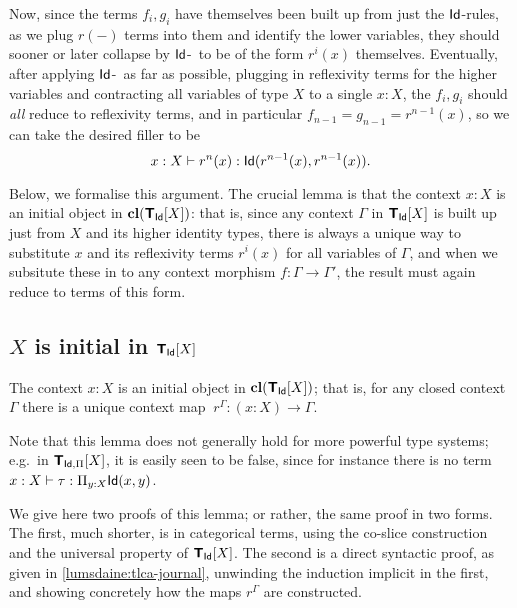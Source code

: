 \begin{center}\end{center}

Now, since the terms $f_i,g_i$ have themselves been built up from just the $\mathsf{Id}$-rules, as we plug $r(-)$ terms into them and identify the lower variables, they should sooner or later collapse by $\mathsf{Id}$-\comp\ to be of the form $r^i(x)$ themselves.  Eventually, after applying $\mathsf{Id}$-\elim\ as far as possible, plugging in reflexivity terms for the higher variables and contracting all variables of type $X$ to a single $x:X$, the $f_i, g_i$ should \emph{all} reduce to reflexivity terms, and in particular $f_{n-1} = g_{n-1} = r^{n-1}(x)$, so we can take the desired filler to be
$$x:X \vdash r^n(x) : \mathsf{Id}(r^{n-1}(x),r^{n-1}(x)).$$

Below, we formalise this argument.  The crucial lemma is that the context $x:X$ is an initial object in $\mathbf{cl}(\textbf{\textsf{T}}_{\mathsf{Id}}[X])$: that is, since any context $\Gamma$ in $\textbf{\textsf{T}}_{\mathsf{Id}}[X]$ is built up just from $X$ and its higher identity types, there is always a unique way to substitute $x$ and its reflexivity terms $r^i(x)$ for all variables of $\Gamma$, and when we subsitute these in to any context morphism $f \colon \Gamma \to \Gamma'$, the result must again reduce to terms of this form.

\subsection{\texorpdfstring{$X$}{X} is initial in \texorpdfstring{$\textbf{\textsf{T}}_{\mathsf{Id}}[X]$}{ML\_Id[X]}} \label{subsec:initiality}

\begin{lemma} \label{lemma:initiality} The context $x:X$ is an initial object in $\mathbf{cl}(\textbf{\textsf{T}}_{\mathsf{Id}}[X])$; that is, for any closed context $\Gamma$ there is a unique context map $\ r^\Gamma \colon (x:X) \to \Gamma$. 
\end{lemma}

Note that this lemma does not generally hold for more powerful type systems; e.g.\ in $\textbf{\textsf{T}}_{\mathsf{Id},\Pi}[X]$, it is easily seen to be false, since for instance there is no term $x:X \vdash \tau : \Pi_{y:X} \mathsf{Id}(x,y)$.

We give here two proofs of this lemma; or rather, the same proof in two forms.  The first, much shorter, is in categorical terms, using the co-slice construction and the universal property of $\textbf{\textsf{T}}_{\mathsf{Id}}[X]$.  The second is a direct syntactic proof, as given in \ref{lumsdaine:tlca-journal}, unwinding the induction implicit in the first, and showing concretely how the maps $r^\Gamma$ are constructed.

